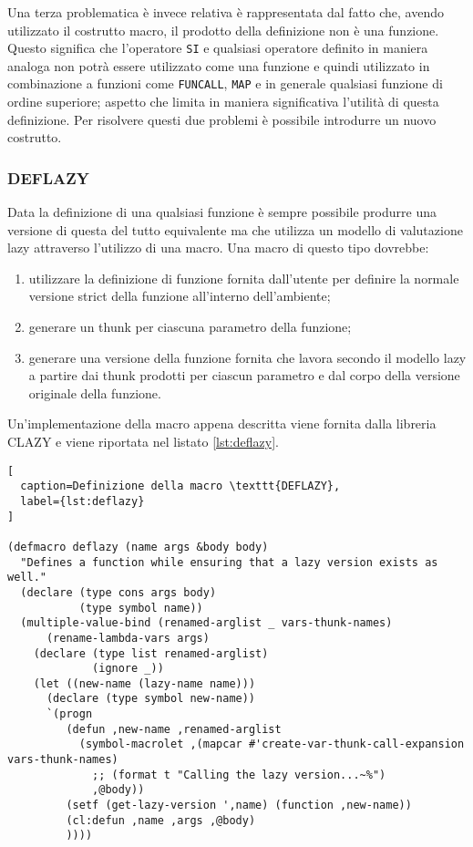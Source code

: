 Una terza problematica è invece relativa è rappresentata dal fatto che, avendo utilizzato il costrutto macro, il prodotto della definizione non è una funzione. Questo significa che l'operatore \texttt{SI} e qualsiasi operatore definito in maniera analoga non potrà essere utilizzato come una funzione e quindi utilizzato in combinazione a funzioni come \texttt{FUNCALL}, \texttt{MAP} e in generale qualsiasi funzione di ordine superiore; aspetto che limita in maniera significativa l'utilità di questa definizione. Per risolvere questi due problemi è possibile introdurre un nuovo costrutto.

\subsubsection{DEFLAZY}

Data la definizione di una qualsiasi funzione è sempre possibile produrre una versione di questa del tutto equivalente ma che utilizza un modello di valutazione lazy attraverso l'utilizzo di una macro. Una macro di questo tipo dovrebbe:

\begin{enumerate}

\item utilizzare la definizione di funzione fornita dall'utente per definire la normale versione strict della funzione all'interno dell'ambiente;

\item generare un thunk per ciascuna parametro della funzione;

\item generare una versione della funzione fornita che lavora secondo il modello lazy a partire dai thunk prodotti per ciascun parametro e dal corpo della versione originale della funzione.

\end{enumerate}

Un'implementazione della macro appena descritta viene fornita dalla libreria CLAZY \cite{Antoniotti14} e viene riportata nel listato \ref{lst:deflazy}.

\begin{lstlisting}[
  caption=Definizione della macro \texttt{DEFLAZY},
  label={lst:deflazy}
]

(defmacro deflazy (name args &body body)
  "Defines a function while ensuring that a lazy version exists as well."
  (declare (type cons args body)
           (type symbol name))
  (multiple-value-bind (renamed-arglist _ vars-thunk-names)
      (rename-lambda-vars args)
    (declare (type list renamed-arglist)
             (ignore _))
    (let ((new-name (lazy-name name)))
      (declare (type symbol new-name))
      `(progn
         (defun ,new-name ,renamed-arglist
           (symbol-macrolet ,(mapcar #'create-var-thunk-call-expansion vars-thunk-names)
             ;; (format t "Calling the lazy version...~%")
             ,@body))
         (setf (get-lazy-version ',name) (function ,new-name))
         (cl:defun ,name ,args ,@body)
         ))))

\end{lstlisting}

